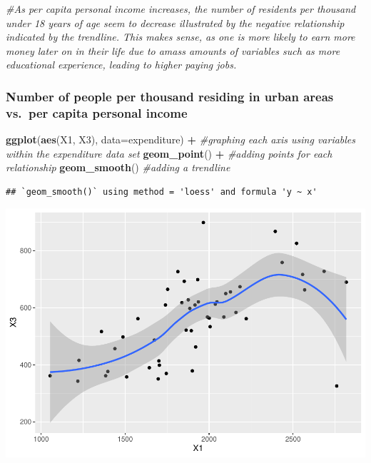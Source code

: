 \documentclass[]{article}
\newenvironment{Shaded}{\begin{snugshade}}{\end{snugshade}}
\newcommand{\CommentTok}[1]{\textcolor[rgb]{0.56,0.35,0.01}{\textit{#1}}}
\newcommand{\DataTypeTok}[1]{\textcolor[rgb]{0.13,0.29,0.53}{#1}}
\newcommand{\KeywordTok}[1]{\textcolor[rgb]{0.13,0.29,0.53}{\textbf{#1}}}
\newcommand{\NormalTok}[1]{#1}
\newcommand{\OperatorTok}[1]{\textcolor[rgb]{0.81,0.36,0.00}{\textbf{#1}}}
\newcommand{\StringTok}[1]{\textcolor[rgb]{0.31,0.60,0.02}{#1}}
\begin{document}
\begin{Shaded}
\begin{Highlighting}[]
\CommentTok{#As per capita personal income increases, the number of residents per thousand under 18 years of age seem to decrease illustrated by the negative relationship indicated by the trendline. This makes sense, as one is more likely to earn more money later on in their life due to amass amounts of variables such as more educational experience, leading to higher paying jobs. }
\end{Highlighting}
\end{Shaded}

\hypertarget{number-of-people-per-thousand-residing-in-urban-areas-vs.-per-capita-personal-income}{%
\subsubsection{Number of people per thousand residing in urban areas
vs.~per capita personal
income}\label{number-of-people-per-thousand-residing-in-urban-areas-vs.-per-capita-personal-income}}

\begin{Shaded}
\begin{Highlighting}[]
\KeywordTok{ggplot}\NormalTok{(}\KeywordTok{aes}\NormalTok{(X1, X3), }\DataTypeTok{data=}\NormalTok{expenditure) }\OperatorTok{+}\StringTok{ }\CommentTok{#graphing each axis using variables within the expenditure data set}
\StringTok{  }\KeywordTok{geom_point}\NormalTok{() }\OperatorTok{+}\StringTok{ }\CommentTok{#adding points for each relationship}
\StringTok{  }\KeywordTok{geom_smooth}\NormalTok{() }\CommentTok{#adding a trendline}
\end{Highlighting}
\end{Shaded}

\begin{verbatim}
## `geom_smooth()` using method = 'loess' and formula 'y ~ x'
\end{verbatim}

\includegraphics{PS_answers_files/figure-latex/unnamed-chunk-8-1.pdf}
\end{document}
